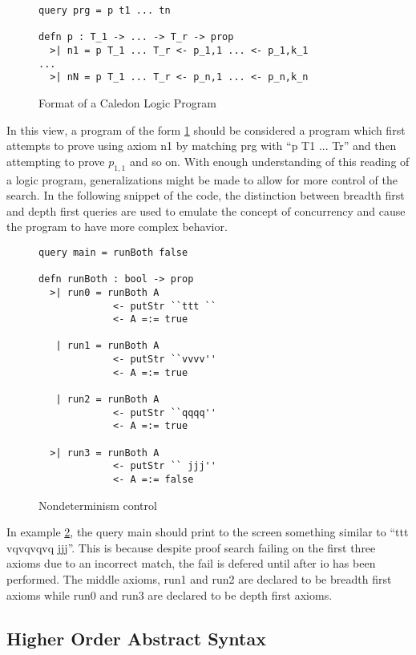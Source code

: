 \begin{figure}[h]
\begin{lstlisting}
query prg = p t1 ... tn

defn p : T_1 -> ... -> T_r -> prop
  >| n1 = p T_1 ... T_r <- p_1,1 ... <- p_1,k_1
...
  >| nN = p T_1 ... T_r <- p_n,1 ... <- p_n,k_n

\end{lstlisting}
\caption{Format of a Caledon Logic Program}
\label{code:format}
\end{figure}

In this view, a program of the form \ref{code:format}
should be considered a program which first attempts to prove using axiom n1 by matching prg with ``p T1 ... Tr'' and then
attempting to prove $p_{1,1}$ and so on.    With enough understanding of this reading of a logic program, generalizations might be made
to allow for more control of the search.  In the following snippet of the code, the distinction between breadth first and depth first
queries are used to emulate the concept of concurrency and cause the program to have more complex behavior.

\begin{figure}[h]
\begin{lstlisting}
query main = runBoth false

defn runBoth : bool -> prop
  >| run0 = runBoth A 
             <- putStr ``ttt ``
             <- A =:= true

   | run1 = runBoth A
             <- putStr ``vvvv''
             <- A =:= true

   | run2 = runBoth A
             <- putStr ``qqqq''
             <- A =:= true

  >| run3 = runBoth A
             <- putStr `` jjj''
             <- A =:= false
\end{lstlisting}
\caption{Nondeterminism control}
\label{code:nondet}
\end{figure}

In example \ref{code:nondet}, the query main should print to the screen something similar to ``ttt vqvqvqvq jjj''.  This is because
despite proof search failing on the first three axioms due to an incorrect match, 
the fail is defered until after io has been performed.  The middle axioms, run1 and run2 are declared to be
breadth first axioms while run0 and run3 are declared to be depth first axioms.  


\subsection{Higher Order Abstract Syntax}

